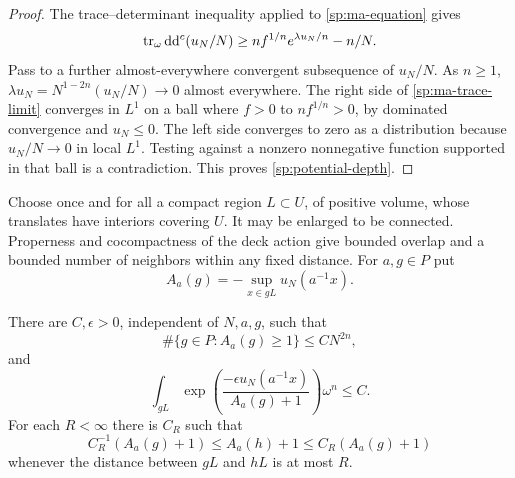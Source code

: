 \begin{proof}
The trace--determinant inequality applied to \eqref{sp:ma-equation}
gives
\begin{equation}\label{sp:ma-trace-limit}
 \operatorname{tr}_\omega\mathrm d\mathrm d^c(u_N/N)
 \ge n f^{1/n}e^{\lambda u_N/n}-n/N.
\end{equation}
Pass to a further almost-everywhere convergent subsequence of $u_N/N$.
As $n\ge1$,
$\lambda u_N=N^{1-2n}(u_N/N)\to0$ almost everywhere.  The right side of
\eqref{sp:ma-trace-limit} converges in $L^1$ on a ball where $f>0$ to
$nf^{1/n}>0$, by dominated convergence and $u_N\le0$.  The left side
converges to zero as a distribution because $u_N/N\to0$ in local
$L^1$.  Testing against a nonzero nonnegative function supported in that
ball is a contradiction.  This proves \eqref{sp:potential-depth}.
\end{proof}

Choose once and for all a compact region $L\subset U$, of positive
volume, whose translates have interiors covering $U$.  It may be
enlarged to be connected.  Properness and cocompactness of the deck action
give bounded overlap and a bounded number of neighbors within any fixed
distance.  For $a,g\in P$ put
\begin{equation}\label{sp:cell-depth}
 A_a(g)=-\sup_{x\in gL}u_N(a^{-1}x).
\end{equation}

\begin{lemma}\label{sp:cell-lemma}
There are $C,\epsilon>0$, independent of $N,a,g$, such that
\begin{equation}\label{sp:cell-count}
 \#\{g\in P:A_a(g)\ge1\}\le C N^{2n},
\end{equation}
and
\begin{equation}\label{sp:cell-exponential}
 \int_{gL}\exp\!\left(
       \frac{-\epsilon u_N(a^{-1}x)}{A_a(g)+1}\right)\omega^n\le C.
\end{equation}
For each $R<\infty$ there is $C_R$ such that
\begin{equation}\label{sp:cell-neighbors}
 C_R^{-1}(A_a(g)+1)\le A_a(h)+1\le C_R(A_a(g)+1)
\end{equation}
whenever the distance between $gL$ and $hL$ is at most $R$.
\end{lemma}

